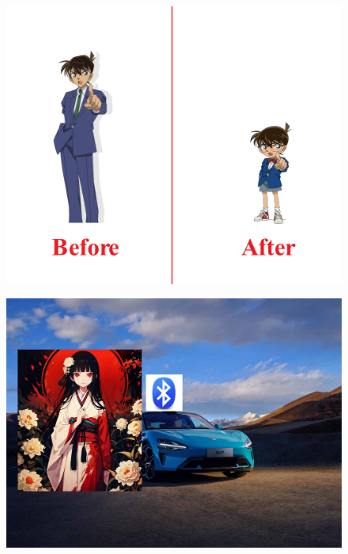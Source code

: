 \documentclass[11pt]{article}
\begin{document}
    \begin{figure}[h!]
        \centering
        \scriptsize
        \begin{minipage}[b]{0.32\linewidth}
            \includegraphics[width=\textwidth]{images/example_image_1.png}   
            \label{fig: example_1} 
        \end{minipage}
        \begin{minipage}[b]{0.32\linewidth}
            \includegraphics[width=\textwidth]{images/example_image_2.png}   

\end{minipage}
\end{figure}
\end{document}
